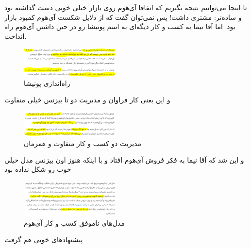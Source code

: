 \documentclass[dvipsnames, svgnames, x11names, 11pt, twocolumn]{article}
\begin{document}
تا اینجا می‌توانیم نتیجه بگیریم که اتفاقا آی‌هوم روی بازار خیلی خوبی دست گذاشته بود و ساده‌تر:‌ مشتری داشت! پس نمی‌توان گفت که از دلایل شکست آی‌هوم کمبود بازار بود. اما آقا نیما یه کسب و کار دیگه‌ای به اسم پونیشا
رو در حین داشتن آی‌هوم راه انداخت.

\begin{figure}[H]
\begin{center}
\includegraphics[width=0.45\textwidth, height=0.09\textheight]{images/ponisha-1}
\caption{راه‌اندازی پونیشا}
\end{center}
\end{figure}

و این یعنی کار فراوان و مدیریت دو تا بیزنس خیلی متفاوت
\begin{figure}[H]
\begin{center}
\includegraphics[width=0.45\textwidth, height=0.09\textheight]{images/ponisha-2}
\caption{مدیریت دو کسب و کار متفاوت و همزمان}
\end{center}
\end{figure}

و این شد که آقا نیما به فکر فروش آی‌هوم افتاد و با اینکه هنوز اون بیزنس مدل خیلی خوب رو شکل نداده بود

\begin{figure}[H]
\begin{center}
\includegraphics[width=0.45\textwidth, height=0.09\textheight]{images/business-model}
\caption{مدل‌های ناموفق کسب و کار آی‌هوم}
\end{center}
\end{figure}

پیشنهاد‌های خوبی هم گرفت
\end{document}
